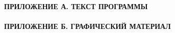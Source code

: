 \tableofcontents
\paragraph{ПРИЛОЖЕНИЕ А. ТЕКСТ ПРОГРАММЫ}
\paragraph{ПРИЛОЖЕНИЕ Б. ГРАФИЧЕСКИЙ МАТЕРИАЛ}
\thispagestyle{empty} %
\newpage








